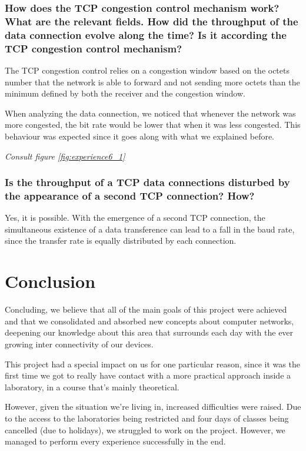 \documentclass[11pt]{report}
\begin{document}
\subsection{How does the TCP congestion control mechanism work? What are the
relevant fields. How did the throughput of the data connection evolve
along the time? Is it according the TCP congestion control mechanism?}

The TCP congestion control relies on a congestion window based on the octets number that the network is able to forward and not sending more octets than the minimum defined by both the receiver and the congestion window.

When analyzing the data connection, we noticed that whenever the network was more congested, the bit rate would be lower that when it was less congested. This behaviour was expected since it goes along with what we explained before.

\textit{Consult figure \ref{fig:experience6_1}}

\subsection{Is the throughput of a TCP data connections disturbed by the appearance of a second TCP connection? How?}

Yes, it is possible. With the emergence of a second TCP connection, the simultaneous existence of a data transference can lead to a fall in the baud rate, since the transfer rate is equally distributed by each connection.

\chapter{Conclusion}

Concluding, we believe that all of the main goals of this project were achieved and that we consolidated and absorbed new concepts about computer networks, deepening our knowledge about this area that surrounds each day with the ever growing inter connectivity of our devices.

This project had a special impact on us for one particular reason, since it was the first time we got to really have contact with a more practical approach inside a laboratory, in a course that's mainly theoretical.

However, given the situation we're living in, increased difficulties were raised. Due to the access to the laboratories being restricted and four days of classes being cancelled (due to holidays), we struggled to work on the project. 
However, we managed to perform every experience successfully in the end.
\end{document}
